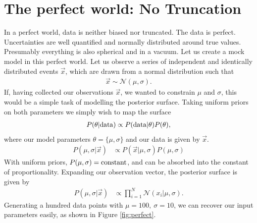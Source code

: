\documentclass[a4paper,fleqn,usenatbib]{mnras}
\begin{document}
\section{The perfect world: No Truncation}
\label{sec:perfect}
In a perfect world, data is neither biased nor truncated. The data is perfect. Uncertainties are well quantified and normally distributed around true values. Presumably everything is also spherical and in a vacuum. Let us create a mock model in this perfect world. Let us observe a series of independent and identically distributed events $\vec{x}$, which are drawn from a normal distribution such that 
\begin{align}
\vec{x} \sim \mathcal{N}(\mu,\sigma).
\end{align}
If, having collected our observations $\vec{x}$, we wanted to constrain $\mu$ and $\sigma$, this would be a simple task of modelling the posterior surface. Taking uniform priors on both parameters we simply wish to map the surface
\begin{align}
P(\theta | {\rm data}) \propto P({\rm data} | \theta) P(\theta),
\end{align}
where our model parameters $\theta = \lbrace \mu, \sigma \rbrace$ and our data is given by $\vec{x}$.
\begin{align}
P(\mu,\sigma| \vec{x}) &\propto P(\vec{x} | \mu, \sigma) P(\mu, \sigma)
\end{align}
With uniform priors, $P(\mu,\sigma) = {\rm constant}$, and can be absorbed into the constant of proportionality. Expanding our observation vector, the posterior surface is given by
\begin{align}
P(\mu,\sigma| \vec{x}) &\propto \prod_{i=1}^N \mathcal{N}(x_i | \mu, \sigma).
\end{align}
Generating a hundred data points with $\mu=100,\ \sigma=10$, we can recover our input parameters easily, as shown in Figure \ref{fig:perfect}.
\end{document}
